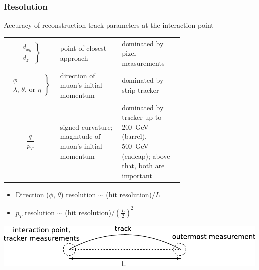 \documentclass[compress]{beamer}
\begin{document}
\begin{frame}
\frametitle{Resolution}

Accuracy of reconstruction track parameters at the interaction point

\vfill
\begin{tabular}{c p{0.35\linewidth} p{0.35\linewidth}}
$\left.\begin{array}{c} d_{xy} \\ d_z \end{array}\right\}$ & point of closest approach & dominated by pixel measurements \\
$\left.\begin{array}{c} \phi \\ \lambda\mbox{, }\theta\mbox{, or }\eta \end{array}\right\}$ & direction of muon's initial momentum & dominated by strip tracker \\
$\begin{array}{c} \\ \dfrac{q}{p_T} \end{array}$ & signed curvature; magnitude of muon's initial momentum & dominated by tracker up to 200~GeV (barrel), 500~GeV (endcap); above that, both are important
\end{tabular}

\begin{itemize}
\item Direction ($\phi$, $\theta$) resolution $\sim$ (hit resolution)$/L$
\item $p_T$ resolution $\sim$ (hit resolution)$/\left(\frac{L}{2}\right)^2$
\end{itemize}

\includegraphics[width=\linewidth]{sagitta.pdf}
\end{frame}
\end{document}

